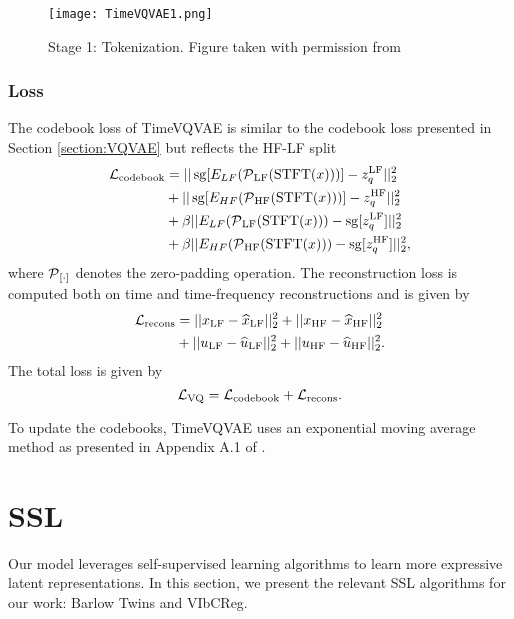 \documentclass[../../thesis.tex]{subfiles}
\begin{document}
\begin{figure}[h]
    \texttt{[image: TimeVQVAE1.png]}
    \centering 
    \caption{Stage 1: Tokenization. Figure taken with permission from \cite{TimeVQVAE}}
    \label{fig:TimeVQVAE1}
\end{figure}

\subsubsection{Loss}

The codebook loss of TimeVQVAE is similar to the codebook loss presented in Section \ref{section:VQVAE} but reflects the HF-LF split
\begin{equation}
    \label{eq:TimeVQVAE_codebook}
    \begin{aligned}
        \mathcal{L}_\text{codebook} &= ||\operatorname{sg}[E_{LF}(\operatorname{\mathcal{P}}_{\mathrm{LF}}(\operatorname{\mathrm{STFT}}(x)))] - z_q^{\mathrm{LF}} ||_2^2 \\
                              &+ ||\operatorname{sg}[E_{HF}(\operatorname{\mathcal{P}}_{\mathrm{HF}}(\operatorname{\mathrm{STFT}}(x)))] - z_q^{\mathrm{HF}} ||_2^2 \\
                              &+ \beta||E_{LF}(\operatorname{\mathcal{P}}_{\mathrm{LF}}(\operatorname{\mathrm{STFT}}(x))) - \operatorname{sg}[z_q^{\mathrm{LF}}]||_2^2 \\
                              &+ \beta||E_{HF}(\operatorname{\mathcal{P}}_{\mathrm{HF}}(\operatorname{\mathrm{STFT}}(x))) - \operatorname{sg}[z_q^{\mathrm{HF}}]||_2^2,
    \end{aligned}
\end{equation}
where $\operatorname{\mathcal{P}}_{[\cdot]}$ denotes the zero-padding operation. 
The reconstruction loss is computed both on time and time-frequency reconstructions and is given by
\begin{equation}
    \label{eq:TimeVQVAE_recons}
    \begin{aligned}
        \mathcal{L}_\text{recons} &= ||x_{\mathrm{LF}} - \widehat{x}_{\mathrm{LF}} ||_2^2 + ||x_{\mathrm{HF}} - \widehat{x}_{\mathrm{HF}} ||_2^2\\
                              &+ ||u_{\mathrm{LF}} - \widehat{u}_{\mathrm{LF}} ||_2^2 + ||u_{\mathrm{HF}} - \widehat{u}_{\mathrm{HF}} ||_2^2.
    \end{aligned}
\end{equation}
The total loss is given by 
\begin{equation}
    \label{eq:TimeVQVAE_loss}
    \mathcal{L}_\text{VQ} = \mathcal{L}_\text{codebook} + \mathcal{L}_\text{recons}.
\end{equation}

To update the codebooks, TimeVQVAE uses an exponential moving average method as presented in Appendix A.1 of \cite{VQVAE}.


\section{SSL}
Our model leverages self-supervised learning algorithms to learn more expressive latent representations. In this section, we present the relevant SSL algorithms for our work: Barlow Twins and VIbCReg.
\end{document}
